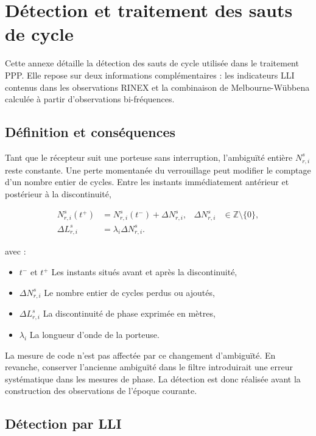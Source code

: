 \chapter{Détection et traitement des sauts de cycle}
\label{ann:cycle_slips}

Cette annexe détaille la détection des sauts de cycle utilisée dans le
traitement PPP. Elle repose sur deux informations complémentaires : les
indicateurs LLI contenus dans les observations RINEX et la combinaison de
Melbourne-Wübbena calculée à partir d'observations bi-fréquences.

\section{Définition et conséquences}

Tant que le récepteur suit une porteuse sans interruption, l'ambiguïté entière
$N_{r,i}^s$ reste constante. Une perte momentanée du verrouillage peut modifier
le comptage d'un nombre entier de cycles. Entre les instants immédiatement
antérieur et postérieur à la discontinuité,

\begin{align}
N_{r,i}^s(t^+)
&=N_{r,i}^s(t^-)+\Delta N_{r,i}^s,
&
\Delta N_{r,i}^s&\in\mathbb Z\setminus\{0\},
\\
\Delta L_{r,i}^s&=\lambda_i\Delta N_{r,i}^s.
\label{ann:eq:cycle_slip_definition}
\end{align}

avec :

\begin{itemize}
    \item $t^-$ et $t^+$ Les instants situés avant et après la
    discontinuité,
    \item $\Delta N_{r,i}^s$ Le nombre entier de cycles perdus ou ajoutés,
    \item $\Delta L_{r,i}^s$ La discontinuité de phase exprimée en mètres,
    \item $\lambda_i$ La longueur d'onde de la porteuse.
\end{itemize}

La mesure de code n'est pas affectée par ce changement d'ambiguïté. En
revanche, conserver l'ancienne ambiguïté dans le filtre introduirait une erreur
systématique dans les mesures de phase. La détection est donc réalisée avant
la construction des observations de l'époque courante.

\section{Détection par LLI}

